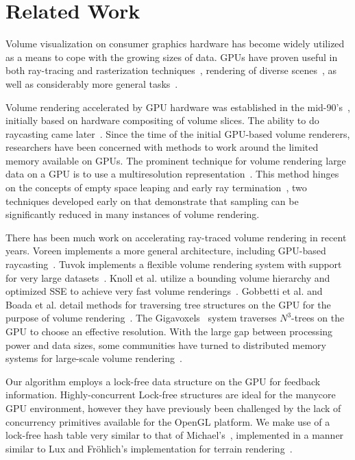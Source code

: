 \section{Related Work}

Volume visualization on consumer graphics hardware has become widely
utilized as a means to cope with the growing sizes of data.  GPUs have
proven useful in both ray-tracing and rasterization
techniques~\cite{Reichl:2012:HybridSurface, Dick:2009:Terrain},
rendering of diverse scenes~\cite{Parker:2010:Optix}, as well
as considerably more general tasks~\cite{Owens:2007:GPGPU}.

Volume rendering accelerated by GPU hardware was established in the
mid-90's~\cite{Cullip:1993:AVRW, Cabral:1994:AVRA}, initially based on
hardware compositing of volume slices.  The ability to do raycasting
came later~\cite{Krueger:2003:ATGV}.  Since the time of the initial
GPU-based volume renderers, researchers have been concerned with
methods to work around the limited memory available on GPUs.  The
prominent technique for volume rendering large data on a GPU is to use
a multiresolution
representation~\cite{Boada:2001:Multires, LaMar:2000:Multires,
Weiler:2000:LoD}.  This method hinges on the concepts of empty space
leaping and early ray termination~\cite{Levoy:EarlyTermination}, two
techniques developed early on that demonstrate that sampling can be
significantly reduced in many instances of volume rendering.

There has been much work on accelerating ray-traced volume rendering in
recent years.  Voreen implements a more general architecture,
including GPU-based raycasting~\cite{Voreen:2009}.  Tuvok implements a
flexible volume rendering system with support for very large
datasets~\cite{Fogal:2010:Tuvok, Fogal:2009:SizeMatters}.  Knoll et al.
utilize a bounding volume hierarchy and optimized SSE to achieve very
fast
volume renderings~\cite{Knoll:2010:BVH}.  Gobbetti et al. and Boada et
al. detail methods for traversing tree structures on the GPU for
the purpose of volume rendering~\cite{Gobbetti:2008:VR,
Boada:2001:Octree}.
The Gigavoxels~\cite{Crassin:2009:Gigavoxels} system traverses
$N^3$-trees on the GPU to choose an effective resolution.  With the
large gap between processing power and data sizes, some communities
have turned to distributed memory systems for large-scale
volume rendering~\cite{Childs:2006:ScalableVR, Howison:2010:MPIHybrid,
Fogal:2010:HPG, Beyer:2012:DSM}.

Our algorithm employs a lock-free data structure on the GPU for
feedback information.  Highly-concurrent Lock-free structures are ideal
for the manycore GPU environment, however they have previously been
challenged by the lack of concurrency primitives available for the
OpenGL platform.  We make use of a lock-free hash table very similar to
that of Michael's~\cite{Michael:2002:LockFreeHT}, implemented in a
manner similar to Lux and Fr\"ohlich's implementation for terrain
rendering~\cite{Lux:2011:RCHeight}.

